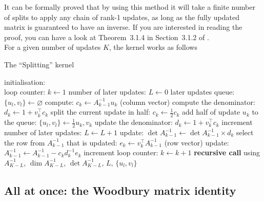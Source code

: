 \documentclass[11pt]{article}
\numberwithin{figure}{section}
\numberwithin{table}{section}
\begin{document}
				It can be formally proved that by using this method it will take a finite number of splits to apply any chain of rank-1 updates, as long as the fully updated matrix is guaranteed to have an inverse. If you are interested in reading the proof, you can have a look at Theorem~3.1.4 in Section~3.1.2 of \cite{jtslagel2015}.\\
				
				For a given number of updates $K$, the kernel works as follows\\
				
				\begin{algorithm}[H]
				\caption{The ``Splitting'' kernel}\label{algo:splitting}
				initialisation:\\
				loop counter: $k \gets 1$\;
				number of later updates: $L \gets 0$\;
				later updates queue: $\{u_l, v_l\} \gets \varnothing$\;
				{
					compute: $c_k \gets A^{-1}_{k-1}u_k$ (column vector)\;
					compute the denominator: $d_k \gets 1 + v_k^\top c_k$\;
					{
						split the current update in half: $c_k\gets \frac{1}{2}c_k$\;
						add half of update $u_k$ to the queue: $\{u_l,v_l\} \gets \frac{1}{2}u_k, v_k$\;
						update the denominator: $d_k\gets 1 + v_k^\top c_k$\;
						increment number of later updates: $L \gets L + 1$\;
					}
					update: $\det A^{-1}_{k-1} \gets \det A^{-1}_{k-1}\times d_k$\;
					select the row from $A^{-1}_{k-1}$ that is updated: $e_k \gets v_k^\top A^{-1}_{k-1}$ (row vector)\;
					update: $A^{-1}_{k-1} \gets A^{-1}_{k-1} - c_kd_k^{-1}e_k$\;
					increment loop counter: $k \gets k + 1$\;
				}
				{
					\textbf{recursive call} using $A^{-1}_{K-L}$, $\dim A^{-1}_{K-L}$, $\det A^{-1}_{K-L} $, $L$, $\{u_l, v_l\}$\;
				}
				\end{algorithm}
			
    \subsection{All at once: the Woodbury matrix identity}
			
\end{document}
